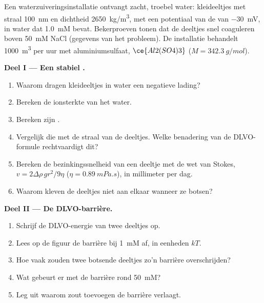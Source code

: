 \begin{problem}
\label{pb:b3:colloids:1}
Een waterzuiveringsinstallatie ontvangt zacht, troebel water: kleideeltjes
met straal
\qty{100}{nm} en dichtheid \qty{2650}{kg/m^3}, met een potentiaal van de  van \qty{-30}{mV}, in
water dat \qty{1.0}{mM}  bevat. Bekerproeven tonen dat de deeltjes snel coaguleren
boven \qty{50}{mM} NaCl (gegevens van het probleem). De installatie behandelt \qty{1000}{m^3} per
uur met aluminiumsulfaat, $\ce{Al2(SO4)3}$ ($M = \qty{342.3}{g/mol}$).

\medskip\noindent\textbf{Deel I --- Een stabiel .}
\begin{enumerate}
  \item Waarom dragen kleideeltjes in water een negatieve lading?
  \item Bereken de ionsterkte van het water.
  \item Bereken zijn .
  \item Vergelijk die met de straal van de deeltjes. Welke benadering van
        de DLVO-formule rechtvaardigt dit?
  \item Bereken de bezinkingssnelheid van een deeltje met de wet van Stokes, $v =
        2\Delta\rho\,gr^2/9\eta$ ($\eta = \qty{0.89}{mPa.s}$), in millimeter per dag.
  \item Waarom kleven de deeltjes niet aan elkaar wanneer ze botsen?
\end{enumerate}

\medskip\noindent\textbf{Deel II --- De DLVO-barrière.}
\begin{enumerate}[resume]
  \item Schrijf de DLVO-energie van twee deeltjes op.
  \item Lees op de figuur de barrière bij \qty{1}{mM} af, in eenheden $kT$.
  \item Hoe vaak zouden twee botsende deeltjes zo'n barrière overschrijden?
  \item Wat gebeurt er met de barrière rond \qty{50}{mM}?
  \item Leg uit waarom zout toevoegen de barrière verlaagt.
\end{enumerate}


\end{problem}
